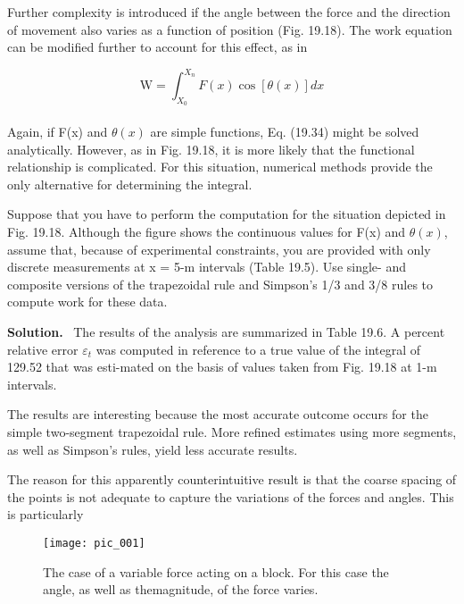 \documentclass[../main.tex]{subfiles}
\begin{document}
Further complexity is introduced if the angle between the force and the direction of
movement also varies as a function of position (Fig. 19.18). The work equation can be
modified further to account for this effect, as in

\begin{equation}
	\tag{19.34}
	\mathrm{W}=\int^{X_{n}}_{X_{0}}F(x)\cos[\theta(x)]dx
\end{equation}\\
Again, if F(x) and $\theta(x)$ are simple functions, Eq. (19.34) might be solved analytically. However, as in Fig. 19.18, it is more likely that the functional relationship is complicated. For
this situation, numerical methods provide the only alternative for determining the integral.

Suppose that you have to perform the computation for the situation depicted in
Fig. 19.18. Although the figure shows the continuous values for F(x) and 
$\theta(x)$, assume that, 
because of experimental constraints, you are provided with only discrete measurements at
x = 5-m intervals (Table 19.5). Use single- and composite versions of the trapezoidal rule
and Simpson's 1/3 and 3/8 rules to compute work for these data.

\vspace{0.1in}

\large\textbf{Solution.} \, The results of the analysis are summarized in
Table 19.6. A percent relative error $\varepsilon_{t}$ was computed in reference to a true value of the integral of 129.52 that was esti-mated on the basis of values taken from Fig. 19.18 at 1-m intervals.

The results are interesting because the most accurate outcome occurs for the simple
two-segment trapezoidal rule. More refined estimates using more segments, as well as
Simpson's rules, yield less accurate results. 

The reason for this apparently counterintuitive result is that the coarse spacing of the
points is not adequate to capture the variations of the forces and angles. This is particularly

\begin{figure}[hbt!]
	\centering
	\texttt{[image: pic\_001]}
	\caption{\textsf{The case of a variable force acting on a block. For
	   this case the angle, as well as themagnitude, of the force varies.}} 
	\label{pic.001}
\end{figure}

\vspace{0,2in}
\end{document}
